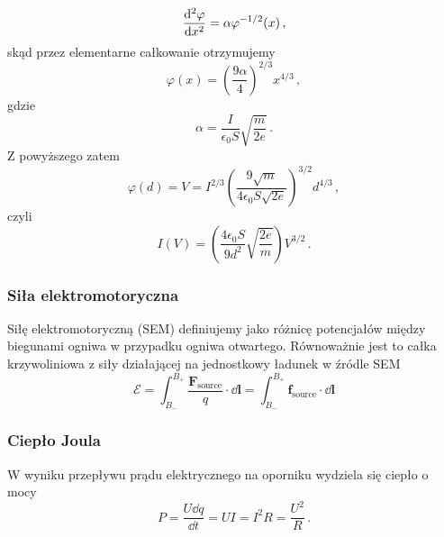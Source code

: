 \documentclass[../main.tex]{subfiles}
\begin{document}
\begin{equation*}
    \dv[2]{\varphi}{x}=\alpha\varphi^{-1/2}(x)\,,
\end{equation*}
skąd przez elementarne całkowanie otrzymujemy
\begin{equation*}
    \varphi(x)=\left(\frac{9\alpha}{4}\right)^{2/3}x^{4/3}\,,
\end{equation*}
gdzie
\begin{equation*}
    \alpha=\frac{I}{\epsilon_0S}\sqrt{\frac{m}{2e}}\,.
\end{equation*}
Z powyższego zatem
\begin{equation*}
    \varphi(d)=V=I^{2/3}\left(\frac{9\sqrt{m}}{4\epsilon_0S\sqrt{2e}}\right)^{3/2}d^{4/3}\,,
\end{equation*}
czyli
\begin{equation*}
    I(V)=\left(\frac{4\epsilon_0S}{9d^2}\sqrt{\frac{2e}{m}}\right)V^{3/2}\,.
\end{equation*}
    \subsubsection{Siła elektromotoryczna}
    Siłę elektromotoryczną (SEM) definiujemy jako różnicę potencjałów między biegunami ogniwa w przypadku ogniwa otwartego. Równoważnie jest to całka krzywoliniowa z siły działającej na jednostkowy ładunek w źródle SEM
    \begin{equation*}
        \mathcal{E}=\int_{B_-}^{B_+}\frac{\mathbf{F}_\text{source}}{q}\cdot\dd{\mathbf{l}}=\int_{B_-}^{B_+}\mathbf{f}_\text{source}\cdot\dd{\mathbf{l}}
    \end{equation*}
    
    \subsubsection{Ciepło Joula}
    W wyniku przepływu prądu elektrycznego na oporniku wydziela się ciepło o mocy
    \begin{equation*}
        P=\frac{U\dd{q}}{\dd{t}}=UI=I^2R=\frac{U^2}{R}\,.
    \end{equation*}
    
\end{document}
